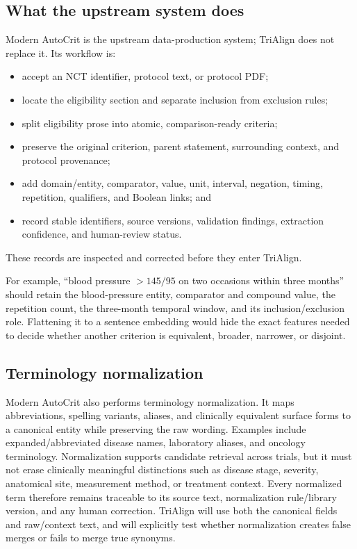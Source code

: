 \documentclass[10pt]{article}
\begin{document}
\subsection{What the upstream system does}
Modern AutoCrit is the upstream data-production system; TriAlign does not replace it. Its workflow is:
\begin{itemize}
\item accept an NCT identifier, protocol text, or protocol PDF;
\item locate the eligibility section and separate inclusion from exclusion rules;
\item split eligibility prose into atomic, comparison-ready criteria;
\item preserve the original criterion, parent statement, surrounding context, and protocol provenance;
\item add domain/entity, comparator, value, unit, interval, negation, timing, repetition, qualifiers, and Boolean links; and
\item record stable identifiers, source versions, validation findings, extraction confidence, and human-review status.
\end{itemize}
These records are inspected and corrected before they enter TriAlign.

For example, ``blood pressure $>145/95$ on two occasions within three months'' should retain the blood-pressure entity, comparator and compound value, the repetition count, the three-month temporal window, and its inclusion/exclusion role. Flattening it to a sentence embedding would hide the exact features needed to decide whether another criterion is equivalent, broader, narrower, or disjoint.

\subsection{Terminology normalization}
Modern AutoCrit also performs terminology normalization. It maps abbreviations, spelling variants, aliases, and clinically equivalent surface forms to a canonical entity while preserving the raw wording. Examples include expanded/abbreviated disease names, laboratory aliases, and oncology terminology. Normalization supports candidate retrieval across trials, but it must not erase clinically meaningful distinctions such as disease stage, severity, anatomical site, measurement method, or treatment context. Every normalized term therefore remains traceable to its source text, normalization rule/library version, and any human correction. TriAlign will use both the canonical fields and raw/context text, and will explicitly test whether normalization creates false merges or fails to merge true synonyms.
\end{document}
